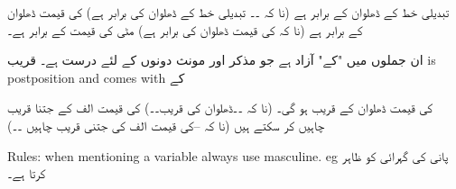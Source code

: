 تبدیلی خط کے ڈھلوان کے برابر ہے (نا کہ  ۔۔  تبدیلی خط کے ڈھلوان کی برابر ہے)
کی قیمت ڈھلوان کے برابر ہے (نا کہ  کی قیمت ڈھلوان کی برابر ہے)
مٹی کی قیمت کے  برابر ہے۔

ان جملوں میں  "کے" آزاد ہے جو مذکر اور مونث دونوں کے لئے درست ہے۔
قریب is postposition and comes with کے

کی قیمت ڈھلوان کے قریب ہو گی۔ (نا کہ   ۔۔ڈھلوان کی قریب۔۔)
کی قیمت الف کے جتنا قریب چاہیں کر سکتے ہیں (نا کہ        --کی قیمت الف کی جتنی قریب چاہیں ۔۔)

Rules:
when mentioning a variable always use masculine. eg
پانی کی گہرائی کو  ظاہر کرتا ہے۔
